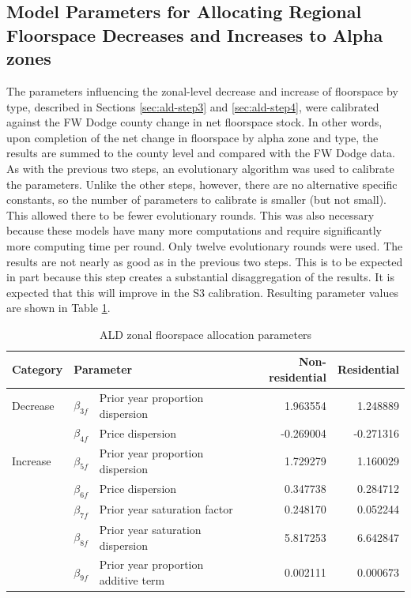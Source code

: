 \subsection{Model Parameters for Allocating Regional Floorspace Decreases and Increases to Alpha zones}\label{sec:ald-inc-dec-alpha}   %
The parameters influencing the zonal-level decrease and increase of floorspace by type, described in Sections \ref{sec:ald-step3} and \ref{sec:ald-step4}, were calibrated against the FW Dodge county change in net floorspace stock. In other words, upon completion of the net change in floorspace by alpha zone and type, the results are summed to the county level and compared with the FW Dodge data. As with the previous two steps, an evolutionary algorithm was used to calibrate the parameters. Unlike the other steps, however, there are no alternative specific constants, so the number of parameters to calibrate is smaller (but not small). This allowed there to be fewer evolutionary rounds. This was also necessary because these models have many more computations and require significantly more computing time per round. Only twelve evolutionary rounds were used. The results are not nearly as good as in the previous two steps. This is to be expected in part because this step creates a substantial disaggregation of the results. It is expected that this will improve in the S3 calibration. Resulting parameter values are shown in Table \ref{tab:zonal-floorspace-alloc}.

\begin{table}  %
\centering
\caption{ALD zonal floorspace allocation parameters}\label{tab:zonal-floorspace-alloc}
\begin{tabular}{lclrr}
\hline
Category & \multicolumn{2}{l}{Parameter} & Non-residential & Residential \\
\hline
Decrease & $\beta_{3f}$ & Prior year proportion dispersion & 1.963554 & 1.248889 \\
 & $\beta_{4f}$ & Price dispersion & -0.269004 & -0.271316 \\
\hline
Increase & $\beta_{5f}$ & Prior year proportion dispersion & 1.729279 & 1.160029 \\
 & $\beta_{6f}$ & Price dispersion & 0.347738 & 0.284712 \\
 & $\beta_{7f}$ & Prior year saturation factor & 0.248170 & 0.052244 \\
 & $\beta_{8f}$ & Prior year saturation dispersion & 5.817253 & 6.642847 \\
 & $\beta_{9f}$ & Prior year proportion additive term & 0.002111 & 0.000673 \\
\hline
\end{tabular}
\end{table}

